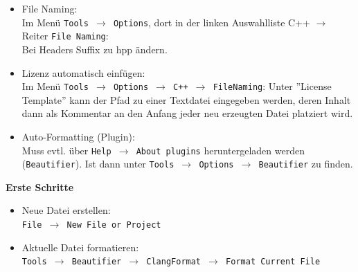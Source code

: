 \begin{itemize}
	\item File Naming:\\
  Im Menü \texttt{Tools $\rightarrow$ Options}, dort in der linken Auswahlliste C++ $\rightarrow$
  Reiter \texttt{File Naming}:\\ Bei Headers Suffix zu hpp ändern.

	\item Lizenz automatisch einfügen:\\

  Im Menü \texttt{Tools $\rightarrow$ Options $\rightarrow$ C++ $\rightarrow$ FileNaming}: Unter ''License
  Template'' kann der Pfad zu einer Textdatei eingegeben werden, deren Inhalt
  dann als Kommentar an den Anfang jeder neu erzeugten Datei platziert wird.

	\item Auto-Formatting (Plugin):\\

  Muss evtl. über \texttt{Help $\rightarrow$ About plugins} heruntergeladen werden (\texttt{Beautifier}).
  Ist dann unter \texttt{Tools $\rightarrow$ Options $\rightarrow$ Beautifier} zu finden.
  \end{itemize}
\textbf{Erste Schritte}\\
\begin{itemize}
	\item Neue Datei erstellen:\\
	\texttt{File $\rightarrow$ New File or Project}
	\item Aktuelle Datei formatieren:\\
	\texttt{Tools $\rightarrow$ Beautifier $\rightarrow$ ClangFormat $\rightarrow$ Format Current File}
\end{itemize}
